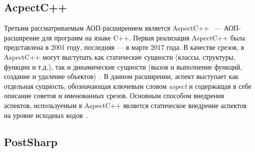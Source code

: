 \documentclass[conference]{IEEEtran}
\begin{document}
\subsection{AcpectC++}
Третьим рассматриваемым АОП-расширением является AspectC++~
\cite{aspectC_homepage} --- АОП-расширение для программ на языке C++.
Первая реализация AspectC++ была представлена в 2001 году, последняя --- в марте
2017 года.
В качестве срезов, в AspectC++ могут выступать как статические сущности (классы,
структуры, функции и т.д.), так и динамические сущности (вызов и выполнение
функций, создание и удаление объектов)~\cite{aspectC_doc}.
В данном расширении, аспект выступает как отдельная сущность, обозначающая
ключевым словом \textit{aspect} и содержащая в себе описание советов и
именованных срезов.
Основным способом внедрения аспектов, используемым в AspectC++ является
статическое внедрение аспектов на уровне исходных кодов~\cite{aspectC_overview}.
\subsection{PostSharp}
\end{document}
